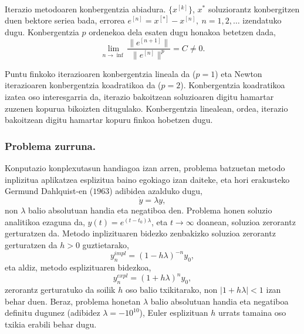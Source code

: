 \paragraph*{}Iterazio metodoaren konbergentzia abiadura. $\{x^{[k]}\}$, $x^{\ast}$ soluziorantz konbergitzen duen bektore seriea bada, errorea $e^{[n]}=x^{[*]}-x^{[n]}, \ n=1,2,\dots$ izendatuko dugu. Konbergentzia $p$ ordenekoa dela esaten dugu honakoa betetzen dada,
\begin{equation*}
\lim\limits_{n\rightarrow \inf} \frac{\|e^{[n+1]}\|}{\|e^{[n]}\|^p}= C \ne 0.
\end{equation*}

Puntu finkoko iterazioaren konbergentzia lineala da ($p=1$) eta Newton iterazioaren konbergentzia koadratikoa da ($p=2$). Konbergentzia koadratikoa izatea oso interesgarria da, iterazio bakoitzean soluzioaren digitu hamartar zuzenen kopurua bikoizten ditugulako. Konbergentzia linealean, ordea, iterazio bakoitzean digitu hamartar kopuru finkoa hobetzen dugu. 
  
\subsubsection*{Problema zurruna.}

Konputazio konplexutasun handiagoa izan arren, problema batzuetan metodo inplizitua aplikatzea esplizitua baino egokiago izan daiteke, eta hori erakusteko Germund Dahlquist-en ($1963$) adibidea azalduko dugu,
\begin{equation}
 \label{eq:202c}
\dot y=\lambda y,
\end{equation} 
non $\lambda$ balio absolutuan handia eta negatiboa den. Problema honen soluzio analitikoa ezaguna da, $y(t)=e^{(t-t_0)\lambda}$, eta $t \rightarrow \infty$ doanean, soluzioa zerorantz gerturatzen da. Metodo inplizituaren bidezko zenbakizko soluzioa zerorantz gerturatzen da $h>0$ guztietarako,
\begin{equation*}
y_n^{impl}=(1-h\lambda)^{-n} y_0,
\end{equation*}    
eta aldiz, metodo esplizituaren bidezkoa,
\begin{equation*}
y_n^{expl}=(1+h\lambda)^{n} y_0,
\end{equation*}    
zerorantz gerturatuko da soilik $h$ oso balio txikitarako, non $|1+h\lambda|<1$ izan behar duen. Beraz, problema honetan $\lambda$ balio absolutuan handia  eta negatiboa definitu dugunez (adibidez $\lambda=-10^{10}$), Euler esplizituan $h$ urrats tamaina oso txikia erabili behar dugu.    

